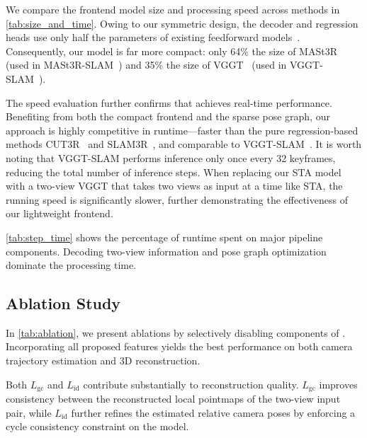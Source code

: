 We compare the frontend model size and processing speed across methods in \cref{tab:size_and_time}. Owing to our symmetric design, the decoder and regression heads use only half the parameters of existing feedforward models~\cite{dust3r,mast3r,wang2025spann3r,liu2025slam3r}. Consequently, our model is far more compact: only 64\% the size of MASt3R~\cite{mast3r} (used in MASt3R-SLAM~\cite{murai2025mast3rslam}) and 35\% the size of VGGT~\cite{wang2025vggt} (used in VGGT-SLAM~\cite{maggio2025vggtslam}).


The speed evaluation further confirms that \ours achieves real-time performance. Benefiting from both the compact frontend and the sparse pose graph, our approach is highly competitive in runtime—faster than the pure regression-based methods CUT3R~\cite{wang2025cut3r} and SLAM3R~\cite{liu2025slam3r}, and comparable to VGGT-SLAM~\cite{maggio2025vggtslam}. It is worth noting that VGGT-SLAM performs inference only once every 32 keyframes, reducing the total number of inference steps. When replacing our STA model with a two-view VGGT that takes two views as input at a time like STA, the running speed is significantly slower, further demonstrating the effectiveness of our lightweight frontend.


\cref{tab:step_time} shows the percentage of runtime spent on major pipeline components. Decoding two-view information and pose graph optimization dominate the processing time.



\subsection{Ablation Study}
\label{subsec:ablation}

In \cref{tab:ablation}, we present ablations by selectively disabling components of \ours. Incorporating all proposed features yields the best performance on both camera trajectory estimation and 3D reconstruction.

Both $L_\text{gc}$ and $L_\text{id}$ contribute substantially to reconstruction quality. $L_\text{gc}$ improves consistency between the reconstructed local pointmaps of the two-view input pair, while $L_\text{id}$ further refines the estimated relative camera poses by enforcing a cycle consistency constraint on the model.




